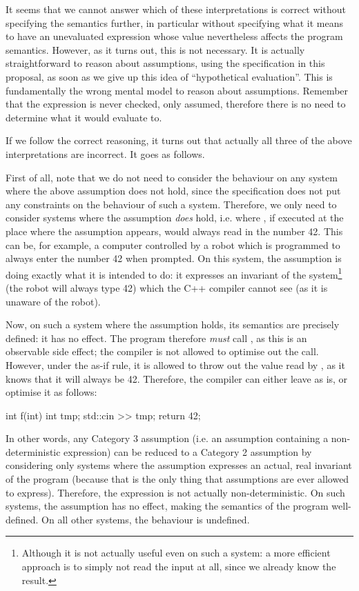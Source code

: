 It seems that we cannot answer which of these interpretations is correct without specifying the semantics further, in particular without specifying what it means to have an unevaluated expression whose value nevertheless affects the program semantics. However, as it turns out, this is not necessary. It is actually straightforward to reason about assumptions, using the specification in this proposal, as soon as we give up this idea of ``hypothetical evaluation''. This is fundamentally the wrong mental model to reason about assumptions. Remember that the expression is never checked, only assumed, therefore there is no need to determine what it would evaluate to.

If we follow the correct reasoning, it turns out that actually all three of the above interpretations are incorrect. It goes as follows.

First of all, note that we do not need to consider the behaviour on any system where the above assumption does not hold, since the specification does not put any constraints on the behaviour of such a system. Therefore, we only need to consider systems where the assumption \emph{does} hold, i.e. where , if executed at the place where the assumption appears, would always read in the number 42. This can be, for example, a computer controlled by a robot which is programmed to always enter the number 42 when prompted. On this system, the assumption is doing exactly what it is intended to do: it expresses an invariant of the system\footnote{Although it is not actually useful even on such a system: a more efficient approach is to simply not read the input at all, since we already know the result.} (the robot will always type 42) which the C++ compiler cannot see (as it is unaware of the robot).

Now, on such a system where the assumption holds, its semantics are precisely defined: it has no effect. The program therefore \emph{must} call , as this is an observable side effect; the compiler is not allowed to optimise out the call. However, under the as-if rule, it is allowed to throw out the value read by , as it knows that it will always be 42. Therefore, the compiler can either leave  as is, or optimise it as follows:
\begin{codeblock}
int f(int) {
  int tmp;
  std::cin >> tmp;
  return 42;
}
\end{codeblock}

In other words, any Category 3 assumption (i.e. an assumption containing a non-deterministic expression) can be reduced to a Category 2 assumption by considering only systems where the assumption expresses an actual, real invariant of the program (because that is the only thing that assumptions are ever allowed to express). Therefore, the expression is not actually non-deterministic. On such systems, the assumption has no effect, making the semantics of the program well-defined. On all other systems, the behaviour is undefined.

